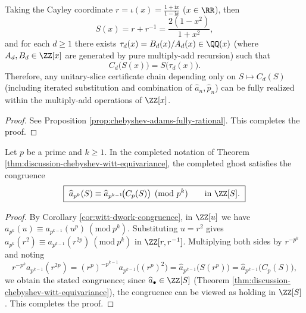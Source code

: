 \begin{corollary}\label{cor:discussion-audit-closure-Zx}
Taking the Cayley coordinate \(r=\iota(x)=\frac{1+\mathrm{i}x}{1-\mathrm{i}x}\) (\(x\in\RR\)), then
\[
S(x)=r+r^{-1}=\frac{2(1-x^2)}{1+x^2},
\]
and for each \(d\ge 1\) there exists \(\tau_d(x)=B_d(x)/A_d(x)\in\QQ(x)\) (where \(A_d,B_d\in\ZZ[x]\) are generated by pure multiply-add recursion) such that
\[
C_d\!\bigl(S(x)\bigr)=S\!\bigl(\tau_d(x)\bigr).
\]
Therefore, any unitary-slice certificate chain depending only on \(S\mapsto C_d(S)\) (including iterated substitution and combination of \(\widehat a_n,\widehat p_n\)) can be fully realized within the multiply-add operations of \(\ZZ[x]\).
\end{corollary}

\begin{proof}
See Proposition \ref{prop:chebyshev-adams-fully-rational}. This completes the proof.
\end{proof}

\begin{theorem}\label{thm:discussion-completed-dwork-chebyshev}
Let \(p\) be a prime and \(k\ge 1\). In the completed notation of Theorem \ref{thm:discussion-chebyshev-witt-equivariance}, the completed ghost satisfies the congruence
\[
\boxed{\ \widehat a_{p^k}(S)\equiv \widehat a_{p^{k-1}}\!\bigl(C_p(S)\bigr)\pmod{p^k}\qquad\text{in }\ZZ[S].\ }
\]
\end{theorem}

\begin{proof}
By Corollary \ref{cor:witt-dwork-congruence}, in \(\ZZ[u]\) we have
\(
a_{p^k}(u)\equiv a_{p^{k-1}}(u^p)\ (\mathrm{mod}\ p^k)
\).
Substituting \(u=r^2\) gives
\(
a_{p^k}(r^2)\equiv a_{p^{k-1}}(r^{2p})\ (\mathrm{mod}\ p^k)
\) in \(\ZZ[r,r^{-1}]\).
Multiplying both sides by \(r^{-p^k}\) and noting
\[
r^{-p^k}a_{p^{k-1}}(r^{2p})
=(r^p)^{-p^{k-1}}a_{p^{k-1}}\!\bigl((r^p)^2\bigr)
=\widehat a_{p^{k-1}}\!\bigl(S(r^p)\bigr)
=\widehat a_{p^{k-1}}\!\bigl(C_p(S)\bigr),
\]
we obtain the stated congruence; since \(\widehat a_{\bullet}\in\ZZ[S]\) (Theorem \ref{thm:discussion-chebyshev-witt-equivariance}), the congruence can be viewed as holding in \(\ZZ[S]\). This completes the proof.
\end{proof}

